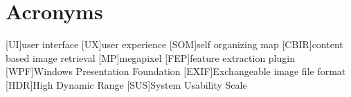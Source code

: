 %
%
%
%
%
%


\chapter*{Acronyms}


\begin{acronym}[TDMA]

[UI]{user interface}
[UX]{user experience}
[SOM]{self organizing map}
[CBIR]{content based image retrieval}
[MP]{megapixel}
[FEP]{feature extraction plugin}
[WPF]{Windows Presentation Foundation}
[EXIF]{Exchangeable image file format}
[HDR]{High Dynamic Range}
[SUS]{System Usability Scale}

\end{acronym}
\vfill

\cleardoublepage